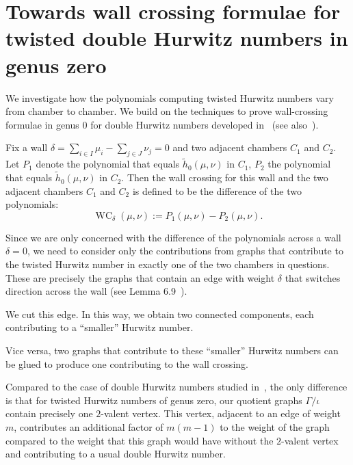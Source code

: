 \documentclass[ALCO,published]{cedram}
\DeclareMathOperator {\WC}{WC}
\begin{document}
\section{Towards wall crossing formulae for twisted double Hurwitz numbers in genus zero}

We investigate how the polynomials computing twisted Hurwitz numbers vary from chamber to chamber. 
We build on the techniques to prove wall-crossing formulae in genus $0$ for double Hurwitz numbers developed in~\cite{CJM10} (see also~\cite{SSV08}). 

\begin{defi}
Fix a wall $\delta=\sum_{i\in I}\mu_i - \sum_{j\in J}\nu_j=0$ and two adjacent chambers $C_1$ and $C_2$. Let $P_1$ denote the polynomial that equals $\tilde{h}_0(\mu,\nu)$ in $C_1$, $P_2$ the polynomial that equals $\tilde{h}_0(\mu,\nu)$ in $C_2$.
Then the wall crossing for this wall and the two adjacent chambers $C_1$ and $C_2$ is defined to be the difference of the two polynomials:
\begin{equation*}
\WC_{\delta}(\mu,\nu):=P_1(\mu,\nu)-P_2(\mu,\nu).
\end{equation*}

\end{defi}
 
Since we are only concerned with the difference of the polynomials across a wall $\delta=0$, we need to consider only the contributions from graphs that contribute to the twisted Hurwitz number in exactly one of the two chambers in questions. These are precisely the graphs that  contain an edge with weight $\delta$ that switches direction across the wall (see Lemma 6.9~\cite{CJM10}). 

We cut this edge. In this way, we obtain two connected components, each contributing to a ``smaller'' Hurwitz number.

Vice versa, two graphs that contribute to these ``smaller'' Hurwitz numbers can be glued to produce one contributing to the wall crossing.

Compared to the case of double Hurwitz numbers studied in~\cite{CJM10}, the only difference is that for twisted Hurwitz numbers of genus zero, our quotient graphs $\Gamma/\iota$ contain precisely one $2$-valent vertex. This vertex, adjacent to an edge of weight $m$, contributes an additional factor of $m(m-1)$ to the weight of the graph compared to the weight that this graph would have without the $2$-valent vertex and contributing to a usual double Hurwitz number.
\end{document}
